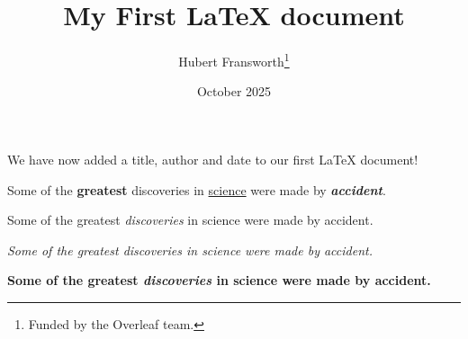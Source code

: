\documentclass[12pt, letterpaper]{article}
\title{My First LaTeX document}
\author{Hubert Fransworth\thanks{Funded by the Overleaf team.}}
\date{October 2025}
\begin{document}
\maketitle
We have now added a title, author and date to our first \LaTeX{} document!


Some of the \textbf{greatest}
discoveries in \underline{science}
were made by \textbf{\textit{accident}}.

Some of the greatest \emph{discoveries} in science were made by accident.

\textit{Some of the greatest \emph{discoveries} in science were made by accident.}

\textbf{Some of the greatest \emph{discoveries} in science were made by accident.}
\end{document}
